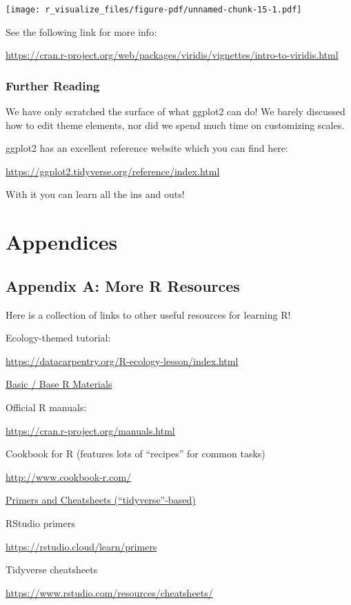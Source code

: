 \documentclass[
  letterpaper,
  DIV=11,
  numbers=noendperiod]{scrreprt}
\begin{document}
\texttt{[image: r\_visualize\_files/figure-pdf/unnamed-chunk-15-1.pdf]}

See the following link for more info:

\url{https://cran.r-project.org/web/packages/viridis/vignettes/intro-to-viridis.html}

\section{Further Reading}\label{further-reading}

We have only scratched the surface of what ggplot2 can do! We barely
discussed how to edit theme elements, nor did we spend much time on
customizing scales.

ggplot2 has an excellent reference website which you can find here:

\url{https://ggplot2.tidyverse.org/reference/index.html}

With it you can learn all the ins and outs!

\part{Appendices}

\chapter{Appendix A: More R
Resources}\label{appendix-a-more-r-resources}

Here is a collection of links to other useful resources for learning R!

Ecology-themed tutorial:

\url{https://datacarpentry.org/R-ecology-lesson/index.html}

\ul{Basic / Base R Materials}

Official R manuals:

\url{https://cran.r-project.org/manuals.html}

Cookbook for R (features lots of ``recipes'' for common tasks)

\url{http://www.cookbook-r.com/}

\ul{Primers and Cheatsheets (``tidyverse''-based)}

RStudio primers

\url{https://rstudio.cloud/learn/primers}

Tidyverse cheatsheets

\url{https://www.rstudio.com/resources/cheatsheets/}
\end{document}
